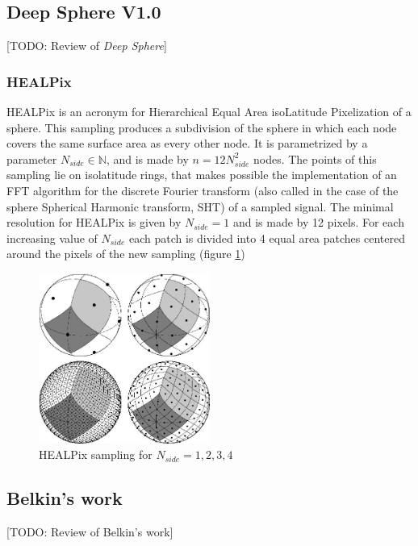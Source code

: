 \subsection{Deep Sphere V1.0}\label{sec:Chapter1:DeepSphere}
[TODO: Review of \textit{Deep Sphere}]
\subsubsection{HEALPix}\label{sec:Chapter1:HEALPix}
HEALPix is an acronym for Hierarchical Equal Area isoLatitude Pixelization of a sphere. This sampling produces a subdivision of the sphere in which each node covers the same surface area as every other node. It is parametrized by a parameter $N_{side}\in\mathbb N$, and is made by $n=12N_{side}^2$ nodes. The points of this sampling lie on isolatitude rings, that makes possible the implementation of an FFT algorithm for the discrete Fourier transform (also called in the case of the sphere Spherical Harmonic transform, SHT) of a sampled signal. The minimal resolution for HEALPix is given by $N_{side}=1$ and is made by 12 pixels. For each increasing value of $N_{side}$ each patch is divided into 4 equal area patches centered around the pixels of the new sampling (figure \ref{fig:healpix sampling})
\begin{figure}
	\centering
	\includegraphics[width=0.5\textwidth]{figs/chapter1/healpix.jpg}
	\caption{\label{fig:healpix sampling}HEALPix sampling for $N_{side}=1,2,3,4$}
\end{figure}
\subsection{Belkin's work}
[TODO: Review of Belkin's work]
